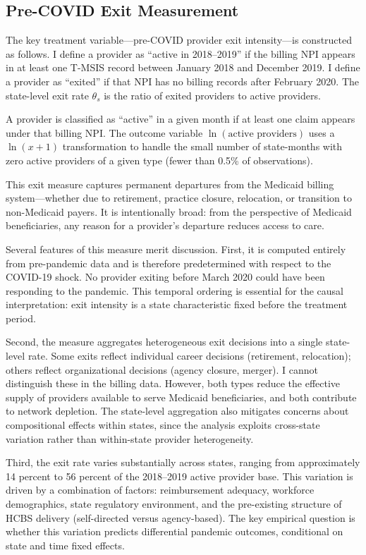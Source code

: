 \documentclass[12pt]{article}
\begin{document}
\subsection{Pre-COVID Exit Measurement}

The key treatment variable---pre-COVID provider exit intensity---is constructed as follows. I define a provider as ``active in 2018--2019'' if the billing NPI appears in at least one T-MSIS record between January 2018 and December 2019. I define a provider as ``exited'' if that NPI has no billing records after February 2020. The state-level exit rate $\theta_s$ is the ratio of exited providers to active providers.

A provider is classified as ``active'' in a given month if at least one claim appears under that billing NPI. The outcome variable $\ln(\text{active providers})$ uses a $\ln(x+1)$ transformation to handle the small number of state-months with zero active providers of a given type (fewer than 0.5\% of observations).

This exit measure captures permanent departures from the Medicaid billing system---whether due to retirement, practice closure, relocation, or transition to non-Medicaid payers. It is intentionally broad: from the perspective of Medicaid beneficiaries, any reason for a provider's departure reduces access to care.

Several features of this measure merit discussion. First, it is computed entirely from pre-pandemic data and is therefore predetermined with respect to the COVID-19 shock. No provider exiting before March 2020 could have been responding to the pandemic. This temporal ordering is essential for the causal interpretation: exit intensity is a state characteristic fixed before the treatment period.

Second, the measure aggregates heterogeneous exit decisions into a single state-level rate. Some exits reflect individual career decisions (retirement, relocation); others reflect organizational decisions (agency closure, merger). I cannot distinguish these in the billing data. However, both types reduce the effective supply of providers available to serve Medicaid beneficiaries, and both contribute to network depletion. The state-level aggregation also mitigates concerns about compositional effects within states, since the analysis exploits cross-state variation rather than within-state provider heterogeneity.

Third, the exit rate varies substantially across states, ranging from approximately 14 percent to 56 percent of the 2018--2019 active provider base. This variation is driven by a combination of factors: reimbursement adequacy, workforce demographics, state regulatory environment, and the pre-existing structure of HCBS delivery (self-directed versus agency-based). The key empirical question is whether this variation predicts differential pandemic outcomes, conditional on state and time fixed effects.
\end{document}
